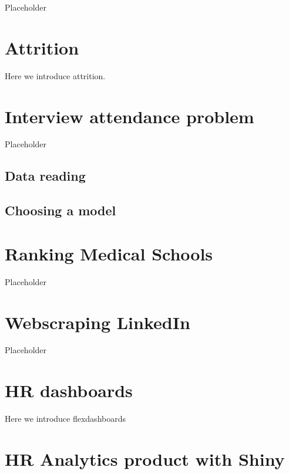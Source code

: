 \documentclass[12pt, krantz2,]{krantz}
\begin{document}
Placeholder

\hypertarget{attrition}{%
\chapter{Attrition}\label{attrition}}

Here we introduce attrition.

\hypertarget{interview-attendance}{%
\chapter{Interview attendance problem}\label{interview-attendance}}

Placeholder

\hypertarget{data-reading-1}{%
\section{Data reading}\label{data-reading-1}}

\hypertarget{choosing-a-model}{%
\section{Choosing a model}\label{choosing-a-model}}

\hypertarget{ranking-medical_school}{%
\chapter{Ranking Medical Schools}\label{ranking-medical_school}}

Placeholder

\hypertarget{webscraping-linkedin}{%
\chapter{Webscraping LinkedIn}\label{webscraping-linkedin}}

Placeholder

\hypertarget{flexdashboards}{%
\chapter{HR dashboards}\label{flexdashboards}}

Here we introduce flexdashboards

\hypertarget{shiny}{%
\chapter{HR Analytics product with Shiny}\label{shiny}}
\end{document}
